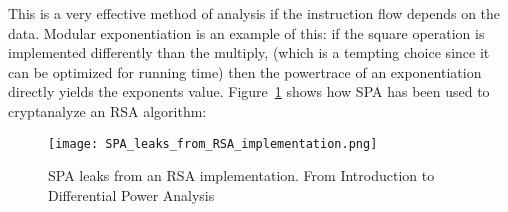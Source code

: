 This is a very effective method of analysis if the instruction flow depends on the data. 
Modular exponentiation is an example of this: if the square operation is implemented differently than the multiply, (which is a tempting choice since it can be optimized for running time) then the powertrace of an exponentiation directly yields the exponents value.
Figure~\ref{fig:SPA_leaks} shows how SPA has been used to cryptanalyze an RSA algorithm:
\begin{figure}[htp]
  \begin{center}
    \texttt{[image: SPA\_leaks\_from\_RSA\_implementation.png]} \\
  \end{center}
  \label{fig:SPA_leaks}
  \caption[caption]{SPA leaks from an RSA implementation. \hspace{\textwidth} From Introduction to Differential Power Analysis \cite{KOCHER2011}}
\end{figure}


